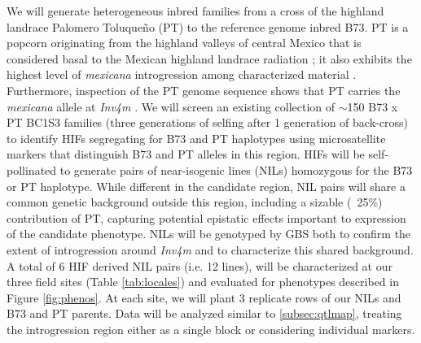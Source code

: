 
We will generate heterogeneous inbred families \citep[HIFs;][]{tuinstra1997heterogeneous} from a cross of the highland landrace Palomero Toluque\~no (PT) to the reference genome inbred B73.  PT is a popcorn originating from the highland valleys of central Mexico that is considered basal to the Mexican highland landrace radiation \citep{reif2006grouping}; it also exhibits the highest level of \emph{mexicana} introgression among characterized material \citep{Matsuoka2002}. Furthermore, inspection of the PT genome sequence \citep{Vielle-Calzada2009} shows that PT carries the \emph{mexicana} allele at \emph{Inv4m} \citep{Hufford2013}. We will screen an existing collection of $\sim$150 B73 x PT BC1S3 families (three generations of selfing after 1 generation of back-cross)  to identify HIFs segregating for B73 and PT haplotypes using microsatellite markers that distinguish B73 and PT alleles in this region. HIFs will be self-pollinated to generate pairs of near-isogenic lines (NILs) homozygous for the B73 or PT haplotype. While different in the candidate region, NIL pairs will share a common genetic background outside this region, including a sizable (~25\%) contribution of PT, capturing potential epistatic effects important to expression of the candidate phenotype. NILs will be genotyped by GBS  both to confirm the extent of introgression around \emph{Inv4m} and to characterize this shared background. A total of 6 HIF derived NIL pairs (i.e. 12 lines), will be characterized at our three field sites (Table \ref{tab:locales}) and evaluated for phenotypes described in Figure \ref{fig:phenos}. At each site, we will plant 3 replicate rows of our NILs and B73 and PT parents. Data will be analyzed similar to \ref{subsec:qtlmap},  treating the introgression region either as a single block or considering individual markers.

